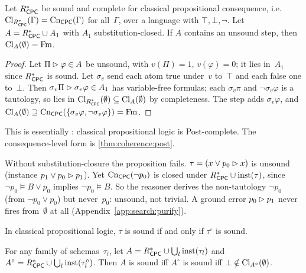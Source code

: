 \begin{proposition}\label{prop:search:post}
Let $R^{*}_{\mathsf{CPC}}$ be sound and complete for classical propositional consequence, i.e.\ $\mathrm{Cl}_{R^{*}_{\mathsf{CPC}}}(\Gamma)=\mathrm{Cn}_{\mathsf{CPC}}(\Gamma)$ for all~$\Gamma$, over a language with $\top,\bot,\neg$. Let $A=R^{*}_{\mathsf{CPC}}\cup A_1$ with $A_1$ substitution-closed. If $A$ contains an unsound step, then $\mathrm{Cl}_A(\emptyset)=\mathrm{Fm}$.
\end{proposition}

\begin{proof}
Let $\Pi\rhd\varphi\in A$ be unsound, with $v(\Pi)=1$, $v(\varphi)=0$; it lies in~$A_1$ since $R^{*}_{\mathsf{CPC}}$ is sound. Let $\sigma_v$ send each atom true under~$v$ to~$\top$ and each false one to~$\bot$. Then $\sigma_v\Pi\rhd\sigma_v\varphi\in A_1$ has variable-free formulas; each $\sigma_v\pi$ and $\neg\sigma_v\varphi$ is a tautology, so lies in $\mathrm{Cl}_{R^{*}_{\mathsf{CPC}}}(\emptyset)\subseteq\mathrm{Cl}_A(\emptyset)$ by completeness. The step adds $\sigma_v\varphi$, and $\mathrm{Cl}_A(\emptyset)\supseteq\mathrm{Cn}_{\mathsf{CPC}}(\{\sigma_v\varphi,\neg\sigma_v\varphi\})=\mathrm{Fm}$.
\end{proof}

This is essentially \citet{post1921}: classical propositional logic is Post-complete. The consequence-level form is \cref{thm:coherence:post}.

\begin{example}\label{ex:search:atoms}
Without substitution-closure the proposition fails. $\tau=(x\vee p_0\rhd x)$ is unsound (instance $p_1\vee p_0\rhd p_1$). Yet $\mathrm{Cn}_{\mathsf{CPC}}(\neg p_0)$ is closed under $R^{*}_{\mathsf{CPC}}\cup\mathrm{inst}(\tau)$, since $\neg p_0\models B\vee p_0$ implies $\neg p_0\models B$. So the reasoner derives the non-tautology $\neg p_0$ (from $\neg p_0\vee p_0$) but never~$p_0$: unsound, not trivial. A ground error $p_0\rhd p_1$ never fires from~$\emptyset$ at all (Appendix~\ref{app:search:purify}).
\end{example}

\begin{lemma}[Purification]\label{lem:search:purify}
In classical propositional logic, $\tau$ is sound if and only if $\tau^\circ$ is sound.
\end{lemma}

\begin{corollary}\label{cor:search:purify}
For any family of schemas~$\tau_l$, let $A=R^{*}_{\mathsf{CPC}}\cup\bigcup_l\mathrm{inst}(\tau_l)$ and $A^\circ=R^{*}_{\mathsf{CPC}}\cup\bigcup_l\mathrm{inst}(\tau_l^\circ)$. Then $A$ is sound iff $A^\circ$ is sound iff $\bot\notin\mathrm{Cl}_{A^\circ}(\emptyset)$.
\end{corollary}

